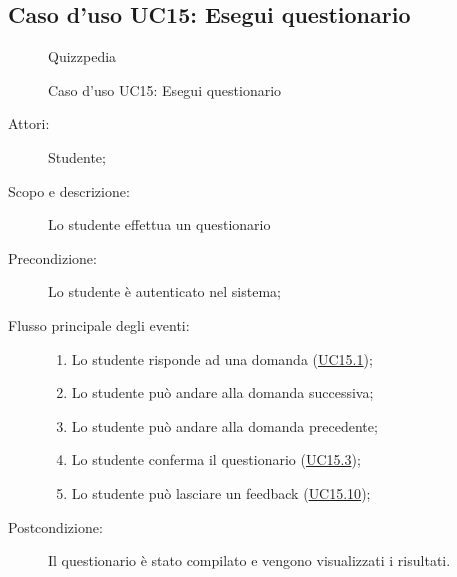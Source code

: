 \subsection{Caso d'uso UC15: Esegui questionario}
        \begin{figure}[H]
            \centering
            \begin{resizedtikzpicture}{\textwidth}
		\begin{umlsystem}[x=0, fill=lightgray!20]{Quizzpedia}
		\end{umlsystem}
            \end{resizedtikzpicture}
            \caption{Caso d'uso UC15: Esegui questionario}
            \label{fig:UC15} 
        \end{figure}
    \begin{description}
\item[Attori:] Studente;
\item[Scopo e descrizione:] Lo studente effettua un questionario
      \item[Precondizione:] Lo studente è autenticato nel sistema;

        \item[Flusso principale degli eventi:] \begin{enumerate}
          \item Lo studente risponde ad una domanda (\hyperlink{UC15.1}{UC15.1});
          \item Lo studente può andare alla domanda successiva;
          \item Lo studente può andare alla domanda precedente;
          \item Lo studente conferma il questionario (\hyperlink{UC15.3}{UC15.3});
          \item Lo studente può lasciare un feedback (\hyperlink{UC15.10}{UC15.10});

      \end{enumerate}
    \item[Postcondizione:] Il questionario è stato compilato e vengono visualizzati i risultati.
  \end{description}
\hypertarget{UC15.1}{}

